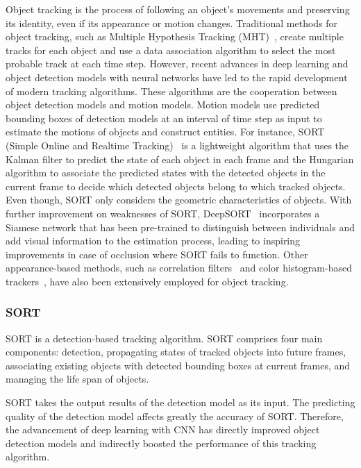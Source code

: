 \documentclass[../main.tex]{subfiles}
\begin{document}
Object tracking is the process of following an object's movements and preserving its identity, even if its appearance or motion changes. Traditional methods for object tracking, such as Multiple Hypothesis Tracking (MHT)~\cite{reid1979algorithm}, create multiple tracks for each object and use a data association algorithm to select the most probable track at each time step. However, recent advances in deep learning and object detection models with neural networks have led to the rapid development of modern tracking algorithms. These algorithms are the cooperation between object detection models and motion models. Motion models use predicted bounding boxes of detection models at an interval of time step as input to estimate the motions of objects and construct entities. For instance, SORT (Simple Online and Realtime Tracking)~\cite{bewley2016simple} is a lightweight algorithm that uses the Kalman filter to predict the state of each object in each frame and the Hungarian algorithm to associate the predicted states with the detected objects in the current frame to decide which detected objects belong to which tracked objects. Even though, SORT only considers the geometric characteristics of objects. With further improvement on weaknesses of SORT, DeepSORT~\cite{wojke2017simple} incorporates a Siamese network that has been pre-trained to distinguish between individuals and add visual information to the estimation process, leading to inspiring improvements in case of occlusion where SORT fails to function. Other appearance-based methods, such as correlation filters~\cite{mekkayil2018object, bolme2010visual} and color histogram-based trackers~\cite{verges2001object, zivkovic2004like}, have also been extensively employed for object tracking.
\subsubsection{SORT}
\label{subsec:sort}
SORT is a detection-based tracking algorithm. SORT comprises four main components: detection, propagating states of tracked objects into future frames, associating existing objects with detected bounding boxes at current frames, and managing the life span of objects.

SORT takes the output results of the detection model as its input. The predicting quality of the detection model affects greatly the accuracy of SORT. Therefore, the advancement of deep learning with CNN has directly improved object detection models and indirectly boosted the performance of this tracking algorithm.
\end{document}
